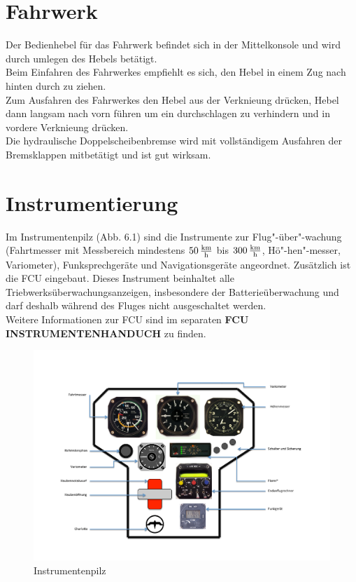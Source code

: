 \section{Fahrwerk}
Der Bedienhebel für das Fahrwerk befindet sich in der Mittelkonsole und wird durch umlegen des Hebels betätigt.\\
Beim Einfahren des Fahrwerkes empfiehlt es sich, den Hebel in einem Zug nach hinten durch zu ziehen.\\
Zum Ausfahren des Fahrwerkes den Hebel aus der Verknieung drücken, Hebel dann langsam nach vorn führen um ein durchschlagen zu verhindern und in vordere Verknieung drücken.\\
Die hydraulische Doppelscheibenbremse wird mit vollständigem Ausfahren der Bremsklappen mitbetätigt und ist gut wirksam.


\section{Instrumentierung}
Im Instrumentenpilz (Abb. 6.1) sind die Instrumente zur Flug"-über"-wachung (Fahrtmesser mit Messbereich mindestens $\unit[50] {\frac{km}{h}}$ bis $\unit[300]{\frac{km}{h}}$, Hö"-hen"-messer, Variometer), Funksprechgeräte und Navigationsgeräte angeordnet.
Zusätzlich ist die FCU eingebaut. Dieses Instrument beinhaltet alle Triebwerksüberwachungsanzeigen, insbesondere der Batterieüberwachung und darf deshalb während des Fluges nicht ausgeschaltet werden.\\

Weitere Informationen zur FCU sind im separaten \textbf{FCU INSTRUMENTENHANDUCH} zu finden.\\

\begin{figure}[ht]
\includegraphics[angle=90,width=\textwidth]{bilder/instrumentenpilz.pdf}
\caption{Instrumentenpilz}
\end{figure}

